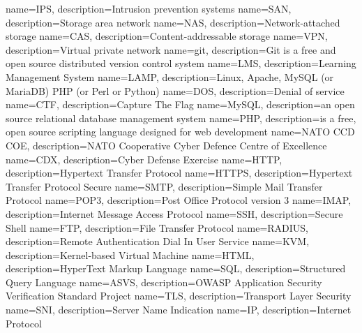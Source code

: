 {
  name=IPS,
  description={Intrusion prevention systems}
}
{
  name=SAN,
  description={Storage area network}
}
{
  name=NAS,
  description={Network-attached storage}
}
{
  name=CAS,
  description={Content-addressable storage}
}
{
  name=VPN,
  description={Virtual private network}
}
{
  name=git,
  description={Git is a free and open source distributed version control system}
}
{
  name=LMS,
  description={Learning Management System}
}
{
  name=LAMP,
  description={Linux, Apache, MySQL (or MariaDB) PHP (or Perl or Python)}
}
{
  name=DOS,
  description={Denial of service}
}
{
  name=CTF,
  description={Capture The Flag}
}
{
  name=MySQL,
  description={an open source relational database management system}
}
{
  name=PHP,
  description={is a free, open source scripting language designed for web development}
}
{
  name=NATO CCD COE,
  description={NATO Cooperative Cyber Defence Centre of Excellence}
}
{
  name=CDX,
  description={Cyber Defense Exercise}
}
{
  name=HTTP,
  description={Hypertext Transfer Protocol}
}
{
  name=HTTPS,
  description={Hypertext Transfer Protocol Secure}
}
{
  name=SMTP,
  description={Simple Mail Transfer Protocol}
}
{
  name=POP3,
  description={Post Office Protocol version 3}
}
{
  name=IMAP,
  description={Internet Message Access Protocol}
}
{
  name=SSH,
  description={Secure Shell}
}
{
  name=FTP,
  description={File Transfer Protocol}
}
{
  name=RADIUS,
  description={Remote Authentication Dial In User Service}
}
{
  name=KVM,
  description={Kernel-based Virtual Machine}
}
{
  name=HTML,
  description={HyperText Markup Language}
}
{
  name=SQL,
  description={Structured Query Language}
}
{
  name=ASVS,
  description={\gls{OWASP} Application Security Verification Standard Project}
}
{
  name=TLS,
  description={Transport Layer Security}
}
{
  name=SNI,
  description={Server Name Indication}
}
{
  name=IP,
  description={Internet Protocol}
}
